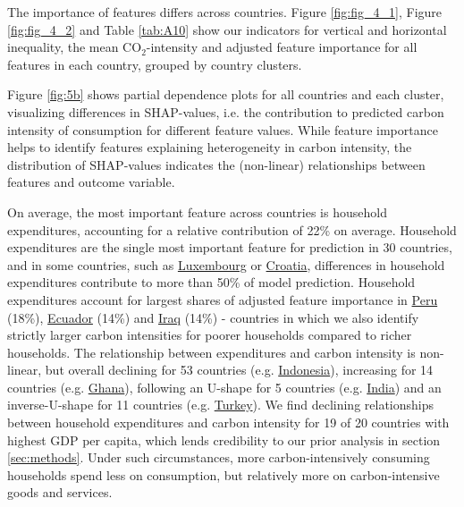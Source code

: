 \documentclass[12pt, a4paper]{article}
\begin{document}
The importance of features differs across countries. Figure \ref{fig:fig_4_1}, Figure \ref{fig:fig_4_2} and Table \ref{tab:A10} show our indicators for vertical and horizontal inequality, the mean CO$_{2}$-intensity and adjusted feature importance for all features in each country, grouped by country clusters. %

Figure \ref{fig:5b} shows partial dependence plots for all countries and each cluster, visualizing differences in SHAP-values, i.e. the contribution to predicted carbon intensity of consumption for different feature values. While feature importance helps to identify features explaining heterogeneity in carbon intensity, the distribution of SHAP-values indicates the (non-linear) relationships between features and outcome variable.

On average, the most important feature across countries is household expenditures, accounting for a relative contribution of 22\% on average. Household expenditures are the single most important feature for prediction in 30 countries, and in some countries, such as \hyperref[fig:5b_LUX]{Luxembourg} or \hyperref[fig:5b_HRV]{Croatia}, differences in household expenditures contribute to more than 50\% of model prediction. Household expenditures account for largest shares of adjusted feature importance in \hyperref[fig:5b_PER]{Peru} (18\%), \hyperref[fig:5b_ECU]{Ecuador} (14\%) and \hyperref[fig:5b_IRQ]{Iraq} (14\%) - countries in which we also identify strictly larger carbon intensities for poorer households compared to richer households. The relationship between expenditures and carbon intensity is non-linear, but overall declining for 53 countries (e.g. \hyperref[fig:5b_EST]{Indonesia}), increasing for 14 countries (e.g. \hyperref[fig:5b_GHA]{Ghana}), following an U-shape for 5 countries (e.g. \hyperref[fig:5b_IND]{India}) and an inverse-U-shape for 11 countries (e.g. \hyperref[fig:5b_TUR]{Turkey}). We find declining relationships between household expenditures and carbon intensity for 19 of 20 countries with highest GDP per capita, which lends credibility to our prior analysis in section \ref{sec:methods}. Under such circumstances, more carbon-intensively consuming households spend less on consumption, but relatively more on carbon-intensive goods and services. %
\end{document}
